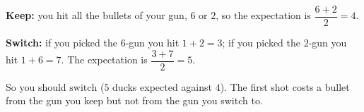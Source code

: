 \textbf{Keep:} you hit all the bullets of your gun, $6$ or $2$, so the expectation is $\dfrac{6+2}{2}=4$.

\textbf{Switch:} if you picked the $6$-gun you hit $1+2=3$; if you picked the $2$-gun you hit $1+6=7$. The expectation is $\dfrac{3+7}2=5$.

So you should $\boxed{\text{switch}}$ ($5$ ducks expected against $4$). The first shot costs a bullet from the gun you keep but not from the gun you switch to.
